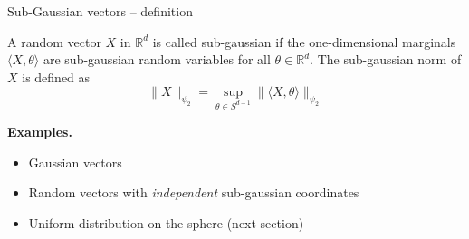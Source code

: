 \documentclass[10pt]{beamer}
\begin{document}
  \begin{frame}{Sub-Gaussian vectors -- definition}
    \begin{definition} A random vector $X$ in
      $\mathbb{R}^{d}$ is called sub-gaussian if the one-dimensional marginals
      $\langle X, \theta \rangle$ are sub-gaussian random variables for all $\theta \in \mathbb{R}^{d} .$ The sub-gaussian norm of $X$ is defined as
      $$
      \|X\|_{\psi_{2}}=\sup _{\theta \in S^{d-1}}\|\langle X, \theta\rangle\|_{\psi_{2}}
      $$

    \end{definition}

    \pause

    \textbf{Examples.}
    
    \begin{itemize}
    \item Gaussian vectors
    \item Random vectors with \emph{independent} sub-gaussian coordinates
    \item Uniform distribution on the sphere (next section)
    \end{itemize}
  \end{frame}
\end{document}
